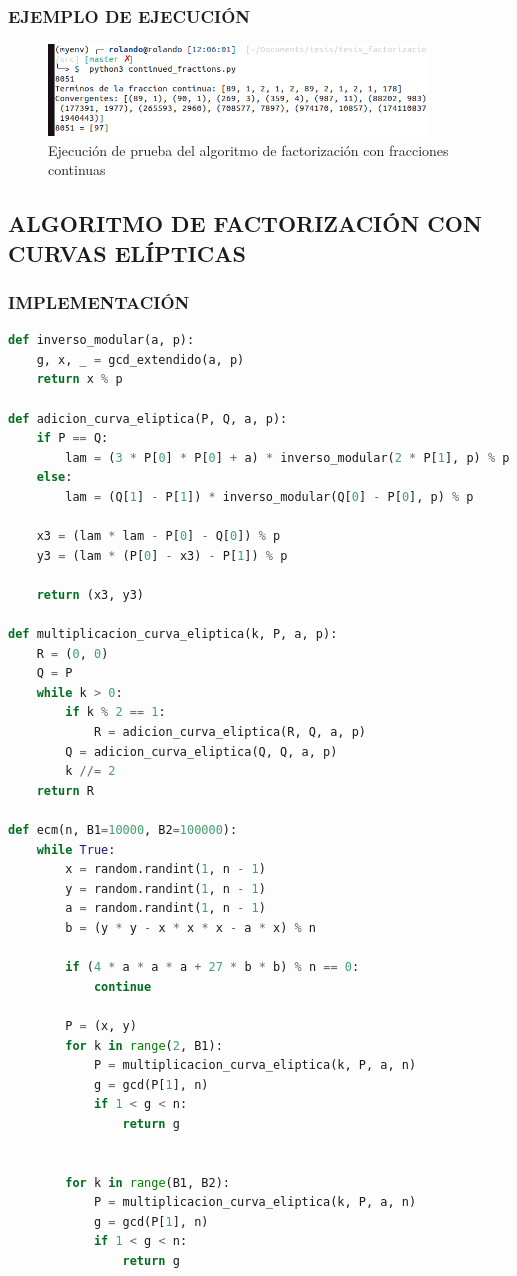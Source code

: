     \subsubsection{EJEMPLO DE EJECUCIÓN}
    \begin{figure}[H]
        \centering
        \includegraphics[width=10cm]{images/fracciones_continuas_pruebas.png}
        \caption{Ejecución de prueba del algoritmo de factorización con fracciones continuas}
    \end{figure}

\subsection{ALGORITMO DE FACTORIZACIÓN CON CURVAS ELÍPTICAS}
\subsubsection{IMPLEMENTACIÓN}
\begin{lstlisting}[language=Python]
def inverso_modular(a, p):
    g, x, _ = gcd_extendido(a, p)
    return x % p

def adicion_curva_eliptica(P, Q, a, p):
    if P == Q:
        lam = (3 * P[0] * P[0] + a) * inverso_modular(2 * P[1], p) % p
    else:
        lam = (Q[1] - P[1]) * inverso_modular(Q[0] - P[0], p) % p

    x3 = (lam * lam - P[0] - Q[0]) % p
    y3 = (lam * (P[0] - x3) - P[1]) % p

    return (x3, y3)

def multiplicacion_curva_eliptica(k, P, a, p):
    R = (0, 0)
    Q = P
    while k > 0:
        if k % 2 == 1:
            R = adicion_curva_eliptica(R, Q, a, p)
        Q = adicion_curva_eliptica(Q, Q, a, p)
        k //= 2
    return R

def ecm(n, B1=10000, B2=100000):
    while True:
        x = random.randint(1, n - 1)
        y = random.randint(1, n - 1)
        a = random.randint(1, n - 1)
        b = (y * y - x * x * x - a * x) % n

        if (4 * a * a * a + 27 * b * b) % n == 0:
            continue

        P = (x, y)
        for k in range(2, B1):
            P = multiplicacion_curva_eliptica(k, P, a, n)
            g = gcd(P[1], n)
            if 1 < g < n:
                return g


        for k in range(B1, B2):
            P = multiplicacion_curva_eliptica(k, P, a, n)
            g = gcd(P[1], n)
            if 1 < g < n:
                return g
\end{lstlisting}

